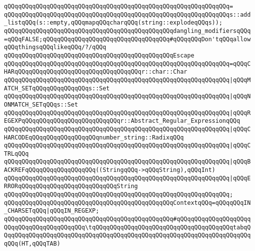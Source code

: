 \verb|qQQqqQQqqQQqqQQqqQQqqQQqqQQqqQQqqQQqqQQqqQQqqQQqqQQqqQQqqQQqqQQq=|\newline
\verb|qQQqqQQqqQQqqQQqqQQqqQQqqQQqqQQqqQQqqQQqqQQqqQQqqQQqqQQqqQQqqQQqs::add_listqQQq(s::empty,qQQqmapqQQqcharqQQq(string::explodeqQQqs));|\newline
\newline
\verb|qQQqqQQqqQQqqQQqqQQqqQQqqQQqqQQqqQQqqQQqqQQqqQQqdangling_modifiersqQQq=qQQqFALSE;qQQqqQQqqQQqqQQqqQQqqQQqqQQqqQQqqQQq#qQQqqQQqDon'tqQQqallowqQQqthingsqQQqlikeqQQq/?/qQQq|\newline
\newline
\verb|qQQqqQQqqQQqqQQqqQQqqQQqqQQqqQQqqQQqqQQqqQQqqQQqEscape|\newline
\verb|qQQqqQQqqQQqqQQqqQQqqQQqqQQqqQQqqQQqqQQqqQQqqQQqqQQqqQQqqQQqqQQq=qQQqCHARqQQqqQQqqQQqqQQqqQQqqQQqqQQqqQQqqQQqr::char::Char|\newline
\verb|qQQqqQQqqQQqqQQqqQQqqQQqqQQqqQQqqQQqqQQqqQQqqQQqqQQqqQQqqQQqqQQq|\verb#|qQQqMATCH_SETqQQqqQQqqQQqqQQqs::Set#\newline
\verb|qQQqqQQqqQQqqQQqqQQqqQQqqQQqqQQqqQQqqQQqqQQqqQQqqQQqqQQqqQQqqQQq|\verb#|qQQqNONMATCH_SETqQQqs::Set#\newline
\verb|qQQqqQQqqQQqqQQqqQQqqQQqqQQqqQQqqQQqqQQqqQQqqQQqqQQqqQQqqQQqqQQq|\verb#|qQQqREGEXPqQQqqQQqqQQqqQQqqQQqqQQqqQQqr::Abstract_Regular_ExpressionqQQq#\newline
\verb|qQQqqQQqqQQqqQQqqQQqqQQqqQQqqQQqqQQqqQQqqQQqqQQqqQQqqQQqqQQqqQQq|\verb#|qQQqCHARCODEqQQqqQQqqQQqqQQqqQQqnumber_string::RadixqQQq#\newline
\verb|qQQqqQQqqQQqqQQqqQQqqQQqqQQqqQQqqQQqqQQqqQQqqQQqqQQqqQQqqQQqqQQq|\verb#|qQQqCTRLqQQq#\newline
\verb|qQQqqQQqqQQqqQQqqQQqqQQqqQQqqQQqqQQqqQQqqQQqqQQqqQQqqQQqqQQqqQQq|\verb#|qQQqBACKREFqQQqqQQqqQQqqQQqqQQq((StringqQQq->qQQqString),qQQqInt)#\newline
\verb|qQQqqQQqqQQqqQQqqQQqqQQqqQQqqQQqqQQqqQQqqQQqqQQqqQQqqQQqqQQqqQQq|\verb#|qQQqERRORqQQqqQQqqQQqqQQqqQQqqQQqqQQqString#\newline
\verb|qQQqqQQqqQQqqQQqqQQqqQQqqQQqqQQqqQQqqQQqqQQqqQQqqQQqqQQqqQQqqQQq;|\newline
\newline
\verb|qQQqqQQqqQQqqQQqqQQqqQQqqQQqqQQqqQQqqQQqqQQqqQQqContextqQQq=qQQqqQQqIN_CHARSETqQQq|\verb#|qQQqIN_REGEXP;#\newline
\newline
\verb|qQQqqQQqqQQqqQQqqQQqqQQqqQQqqQQqqQQqqQQqqQQqqQQq#qQQqqQQqqQQqqQQqqQQqqQQqqQQqqQQqqQQqqQQqqQQq\tqQQqqQQqqQQqqQQqqQQqqQQqqQQqqQQqqQQqqQQqtabqQQqqQQqqQQqqQQqqQQqqQQqqQQqqQQqqQQqqQQqqQQqqQQqqQQqqQQqqQQqqQQqqQQqqQQqqQQq(HT,qQQqTAB)|\newline
